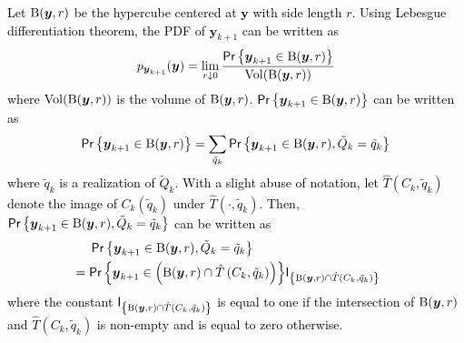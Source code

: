 \documentclass[10pt,twocolumn,twoside]{IEEEtran}
\begin{document}
\begin{IEEEproof} 
\textcolor{black}{Let ${\rm B}{\left({{\ensuremath{\boldsymbol{{y}}}},r}\right)}$ be the hypercube centered at ${\ensuremath{\boldsymbol{{y}}}}$ with side length $r$.  Using Lebesgue differentiation theorem, the PDF of ${\ensuremath{\boldsymbol{{y}}}}_{k+1}$ can be written as
\begin{eqnarray}
p_{{\ensuremath{\boldsymbol{{y}}}}_{k+1}}{\left({{\ensuremath{\boldsymbol{{y}}}}}\right)}=\lim_{r\downarrow0}\frac{{\ensuremath{\mathsf{Pr}\left\{{{\ensuremath{\boldsymbol{{y}}}}_{k+1}\in{\rm B}{\left({{\ensuremath{\boldsymbol{{y}}}},r}\right)}}\right\}}}}{{\rm Vol}{\left({{\rm B}{\left({{\ensuremath{\boldsymbol{{y}}}},r}\right)}}\right)}}
\end{eqnarray}
where ${\rm Vol}{\left({{\rm B}{\left({{\ensuremath{\boldsymbol{{y}}}},r}\right)}}\right)}$ is the volume of ${\rm B}{\left({{\ensuremath{\boldsymbol{{y}}}},r}\right)}$. ${\ensuremath{\mathsf{Pr}\left\{{{\ensuremath{\boldsymbol{{y}}}}_{k+1}\in{\rm B}{\left({{\ensuremath{\boldsymbol{{y}}}},r}\right)}}\right\}}}$ can be written as 
\begin{align}\label{Eq: Prob-Expansion}
{\ensuremath{\mathsf{Pr}\left\{{{\ensuremath{\boldsymbol{{y}}}}_{k+1}\in{\rm B}{\left({{\ensuremath{\boldsymbol{{y}}}},r}\right)}}\right\}}}=\sum_{\tilde{q}_k}{\ensuremath{\mathsf{Pr}\left\{{{\ensuremath{\boldsymbol{{y}}}}_{k+1}\in{\rm B}{\left({{\ensuremath{\boldsymbol{{y}}}},r}\right)},\tilde{Q}_k=\tilde{q}_k}\right\}}}
\end{align}
where $\tilde{q}_k$ is a realization of $\tilde{Q}_k$. With a slight abuse of notation, let ${\ensuremath{\hat{T}\left({C_k},{\tilde{q}_k}\right)}}$ denote the image of $C_k{\left({\tilde{q}_k}\right)}$ under ${\ensuremath{\hat{T}\left({\cdot},{\tilde{q}_k}\right)}}$. Then, ${\ensuremath{\mathsf{Pr}\left\{{{\ensuremath{\boldsymbol{{y}}}}_{k+1}\in{\rm B}{\left({{\ensuremath{\boldsymbol{{y}}}},r}\right)},\tilde{Q}_k=\tilde{q}_k}\right\}}}$ can be written as 
\begin{align}\label{Eq: Prob-Eq}
{\ensuremath{\mathsf{Pr}\left\{{{\ensuremath{\boldsymbol{{y}}}}_{k+1}\in{\rm B}{\left({{\ensuremath{\boldsymbol{{y}}}},r}\right)},\tilde{Q}_k=\tilde{q}_k}\right\}}}&\nonumber\\
&\hspace{-5cm}={\ensuremath{\mathsf{Pr}\left\{{{\ensuremath{\boldsymbol{{y}}}}_{k+1}\in{\left({{\rm B}{\left({{\ensuremath{\boldsymbol{{y}}}},r}\right)}\cap {\ensuremath{\hat{T}\left({C_k},{\tilde{q}_k}\right)}}}\right)}}\right\}}}{\ensuremath{\mathsf{I}_{\left\{{{\rm B}{\left({{\ensuremath{\boldsymbol{{y}}}},r}\right)}\cap {\ensuremath{\hat{T}\left({C_k},{\tilde{q}_k}\right)}}}\right\}}}}
\end{align}
where the constant ${\ensuremath{\mathsf{I}_{\left\{{{\rm B}{\left({{\ensuremath{\boldsymbol{{y}}}},r}\right)}\cap {\ensuremath{\hat{T}\left({C_k},{\tilde{q}_k}\right)}}}\right\}}}}$ is equal to one if the intersection of $ {\rm B}{\left({{\ensuremath{\boldsymbol{{y}}}},r}\right)}$ and ${\ensuremath{\hat{T}\left({C_k},{\tilde{q}_k}\right)}}$ is non-empty and is equal to zero otherwise. 
}


\end{IEEEproof}
\end{document}
